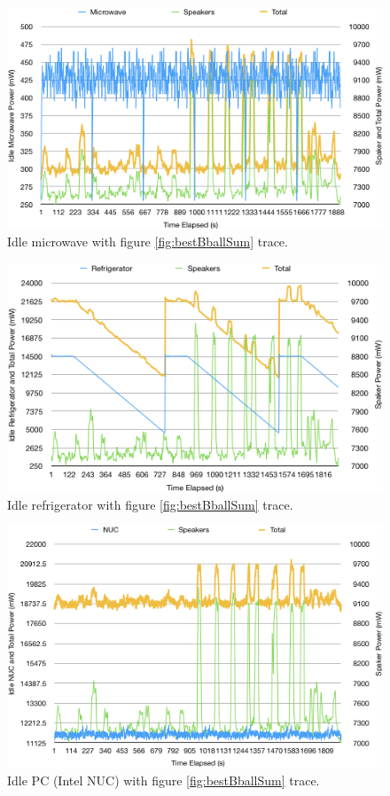 \begin{figure}[H]
  \centering
  \includegraphics[width=1\textwidth]{figures/uWaveIdle.png}
  \caption{Idle microwave with figure \ref{fig:bestBballSum} trace.}
  \label{fig:uWaveIdle}
\end{figure}

\begin{figure}[H]
  \centering
  \includegraphics[width=1\textwidth]{figures/fridgeIdle.png}
  \caption{Idle refrigerator with figure \ref{fig:bestBballSum} trace.}
  \label{fig:fridgeIdle}
\end{figure}

\begin{figure}[H]
  \centering
  \includegraphics[width=1\textwidth]{figures/nucIdle.png}
  \caption{Idle PC (Intel NUC) with figure \ref{fig:bestBballSum} trace.}
  \label{fig:nucIdle}
\end{figure}

